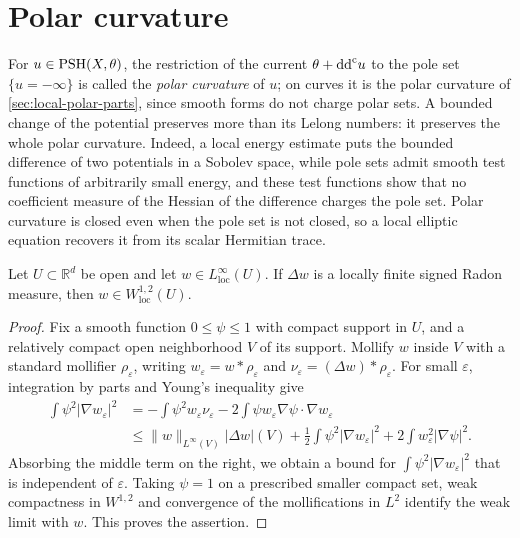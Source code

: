\section{Polar curvature}
\label{sec:psh-polar-invariance}

For $u\in\mathrm{PSH}(X,\theta)$, the restriction of the current $\theta+\mathrm{dd}^{\mathrm{c}} u$ to the pole set $\{u=-\infty\}$ is called the \emph{polar curvature} of $u$; on curves it is the polar curvature of \cref{sec:local-polar-parts}, since smooth forms do not charge polar sets. A bounded change of the potential preserves more than its Lelong numbers: it preserves the whole polar curvature. Indeed, a local energy estimate puts the bounded difference of two potentials in a Sobolev space, while pole sets admit smooth test functions of arbitrarily small energy, and these test functions show that no coefficient measure of the Hessian of the difference charges the pole set. Polar curvature is closed even when the pole set is not closed, so a local elliptic equation recovers it from its scalar Hermitian trace.

\begin{lemma}\label{lem:bounded-measure-laplacian-energy}
Let $U\subset\mathbb R^d$ be open and let $w\in L^\infty_{\mathrm{loc}}(U)$. If $\Delta w$ is a locally finite signed Radon measure, then $w\in W^{1,2}_{\mathrm{loc}}(U)$.
\end{lemma}
\begin{proof}
Fix a smooth function $0\leq\psi\leq1$ with compact support in $U$, and a relatively compact open neighborhood $V$ of its support. Mollify $w$ inside $V$ with a standard mollifier $\rho_\varepsilon$, writing $w_\varepsilon=w*\rho_\varepsilon$ and $\nu_\varepsilon=(\Delta w)*\rho_\varepsilon$. For small $\varepsilon$, integration by parts and Young's inequality give
\[
 \begin{split}
 \int\psi^2|\nabla w_\varepsilon|^2
 &=-\int\psi^2w_\varepsilon\nu_\varepsilon
       -2\int\psi w_\varepsilon\nabla\psi\cdot\nabla w_\varepsilon\\
 &\leq \|w\|_{L^\infty(V)}|\Delta w|(V)
       +\tfrac12\int\psi^2|\nabla w_\varepsilon|^2
       +2\int w_\varepsilon^2|\nabla\psi|^2.
 \end{split}
\]
Absorbing the middle term on the right, we obtain a bound for $\int\psi^2|\nabla w_\varepsilon|^2$ that is independent of $\varepsilon$. Taking $\psi=1$ on a prescribed smaller compact set, weak compactness in $W^{1,2}$ and convergence of the mollifications in $L^2$ identify the weak limit with $w$. This proves the assertion.
\end{proof}

